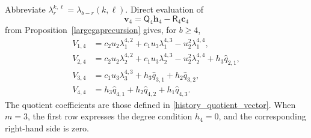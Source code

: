 \documentclass[12pt]{article}
\theoremstyle{remark}
\begin{document}
Abbreviate $\lambda_r^{k,\ell}=\lambda_{b-r}(k,\ell)$.  Direct
evaluation of
\[
 \mathbf v_4=\mathsf Q_4\mathbf h_4-\mathsf R_4\mathbf c_4
\]
from Proposition~\ref{largegaprecursion} gives, for $b\ge4$,
\begin{equation}\label{fourth_rhs}
\begin{aligned}
 V_{1,4}&=c_2u_2\lambda_1^{4,2}
                   +c_1u_3\lambda_1^{4,3}-u_2^2\lambda_1^{4,4},\\
 V_{2,4}&=c_2u_2\lambda_2^{4,2}
                   +c_1u_3\lambda_2^{4,3}-u_2^2\lambda_2^{4,4}
                   +h_3\widehat q_{2,1},\\
 V_{3,4}&=c_1u_3\lambda_3^{4,3}
                   +h_3\widehat q_{3,1}+h_2\widehat q_{3,2},\\
 V_{4,4}&=h_3\widehat q_{4,1}+h_2\widehat q_{4,2}
                                  +h_1\widehat q_{4,3}.
\end{aligned}
\end{equation}
The quotient coefficients are those defined in
\eqref{history_quotient_vector}.  When $m=3$, the first row expresses the degree condition $h_4=0$,
and the corresponding right-hand side is zero.
\end{document}
